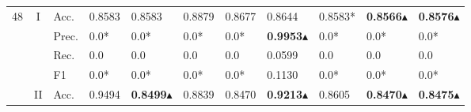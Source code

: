 \begin{tabular}{cclllllllll}
    \midrule
    \multirow{12}{*}{48}                                                                                       & \multirow{4}{*}{I}                & Acc.                                                 & 0.8583                  & 0.8583                  & 0.8879                       & 0.8677                  & 0.8644                                                                       & 0.8583*                                                                     & \textbf{0.8566}$\blacktriangle$                          & \textbf{0.8576}$\blacktriangle$                          \\
                                                                                                               &                                   & Prec.                                                & 0.0*                    & 0.0*                    & 0.0*                         & 0.0*                    & \textbf{0.9953}$\blacktriangle$                                                             & 0.0*                                                                        & 0.0*                                      & 0.0*                                      \\
                                                                                                               &                                   & Rec.                                                 & 0.0                     & 0.0                     & 0.0                          & 0.0                     & 0.0599                                                                       & 0.0                                                                         & 0.0                                       & 0.0                                       \\
                                                                                                               &                                   & F1                                                   & 0.0*                    & 0.0*                    & 0.0*                         & 0.0*                    & 0.1130                                                                       & 0.0*                                                                        & 0.0*                                      & 0.0*                                      \\ 
    \cmidrule{2-11}
                                                                                                               & \multirow{4}{*}{II}               & Acc.                                                 & 0.9494                  & \textbf{0.8499}$\blacktriangle$        & 0.8839                       & 0.8470                  & \textbf{0.9213}$\blacktriangle$                                                             & 0.8605                                                                      & \textbf{0.8470}$\blacktriangle$                          & \textbf{0.8475}$\blacktriangle$                          \\

\end{tabular}
